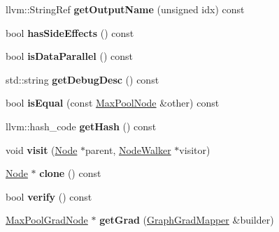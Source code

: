 \begin{DoxyCompactItemize}
llvm\+::\+String\+Ref {\bfseries get\+Output\+Name} (unsigned idx) const
\item 
\mbox{\label{classglow_1_1_max_pool_node_ae58089ae8fdfe7d18372ab25e0bae125}} 
bool {\bfseries has\+Side\+Effects} () const
\item 
\mbox{\label{classglow_1_1_max_pool_node_a87753d103c6c396520099ca924672bef}} 
bool {\bfseries is\+Data\+Parallel} () const
\item 
\mbox{\label{classglow_1_1_max_pool_node_a34f7619ca67c33bbe86bb6a74aaecbed}} 
std\+::string {\bfseries get\+Debug\+Desc} () const
\item 
\mbox{\label{classglow_1_1_max_pool_node_a1cf5b12d2d23c57133552c84b381a61a}} 
bool {\bfseries is\+Equal} (const \hyperlink{classglow_1_1_max_pool_node}{Max\+Pool\+Node} \&other) const
\item 
\mbox{\label{classglow_1_1_max_pool_node_a9bbfbc6343c4866b6bec84e497b91f97}} 
llvm\+::hash\+\_\+code {\bfseries get\+Hash} () const
\item 
\mbox{\label{classglow_1_1_max_pool_node_a795f59f4e7cfe7a11cf0d96846eedd14}} 
void {\bfseries visit} (\hyperlink{classglow_1_1_node}{Node} $\ast$parent, \hyperlink{classglow_1_1_node_walker}{Node\+Walker} $\ast$visitor)
\item 
\mbox{\label{classglow_1_1_max_pool_node_ab6613353720ce67f049ef0052432a6d1}} 
\hyperlink{classglow_1_1_node}{Node} $\ast$ {\bfseries clone} () const
\item 
\mbox{\label{classglow_1_1_max_pool_node_aac84c52d47db01f97b7ab755f5a6a2b8}} 
bool {\bfseries verify} () const
\item 
\mbox{\label{classglow_1_1_max_pool_node_a4ceb5f99a46cd3d4f7722db13743102a}} 
\hyperlink{classglow_1_1_max_pool_grad_node}{Max\+Pool\+Grad\+Node} $\ast$ {\bfseries get\+Grad} (\hyperlink{classglow_1_1_graph_grad_mapper}{Graph\+Grad\+Mapper} \&builder)
\end{DoxyCompactItemize}
